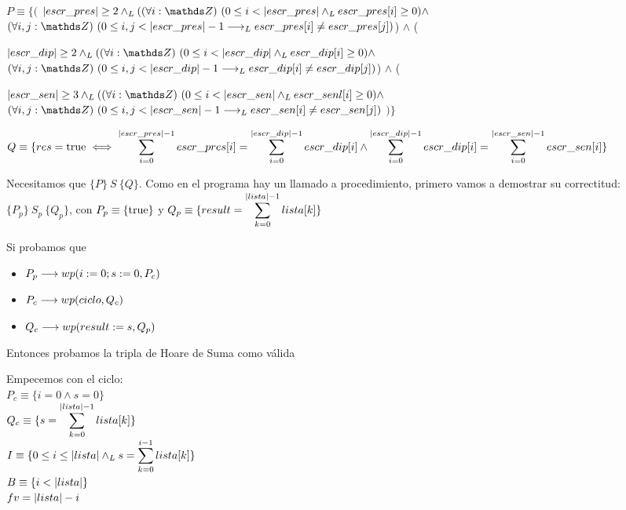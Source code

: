 \documentclass[10pt,a4paper]{article}
\begin{document}
\begin{enumerate}
$P \equiv \{($\newline
$ \longitud{escr\_pres} \geq 2 \yLuego (\paraTodo[unalinea]{i}{\ent}{0 \leq i < \longitud{escr\_pres} \yLuego escr\_pres[i] \geq 0} \land$ \newline
$\paraTodo[unalinea]{i, j}{\ent}{0 \leq i, j < \longitud{escr\_pres} - 1 \implicaLuego escr\_pres[i] \neq escr\_pres[j]}  $\newline ) $\land$ (

$\longitud{escr\_dip} \geq 2 \yLuego (\paraTodo[unalinea]{i}{\ent}{0 \leq i < \longitud{escr\_dip} \yLuego escr\_dip[i] \geq 0} \land$ \newline
$\paraTodo[unalinea]{i, j}{\ent}{0 \leq i, j < \longitud{escr\_dip} - 1 \implicaLuego escr\_dip[i] \neq escr\_dip[j]} $\newline ) $\land$ (

$\longitud{escr\_sen} \geq 3 \yLuego (\paraTodo[unalinea]{i}{\ent}{0 \leq i < \longitud{escr\_sen} \yLuego escr\_senl[i] \geq 0} \land$ \newline
$\paraTodo[unalinea]{i, j}{\ent}{0 \leq i, j < \longitud{escr\_sen} - 1 \implicaLuego escr\_sen[i] \neq escr\_sen[j]}$\newline 
$)\}$

$Q \equiv \{ res = \mathrm{true} \iff 
\displaystyle\sum_{i=0}^{|escr\_pres|-1} escr\_pres[i] = \displaystyle\sum_{i=0}^{|escr\_dip|-1} escr\_dip[i] \land 
\displaystyle\sum_{i=0}^{|escr\_dip|-1} escr\_dip[i] = \displaystyle\sum_{i=0}^{|escr\_sen|-1} escr\_sen[i] \}$
\newline \newline \newline

Necesitamos que $\{P\} \ S\ \{Q\}$. Como en el programa hay un llamado a procedimiento, primero vamos a demostrar su correctitud:
$\{P_p\} \ S_p\ \{Q_p\}$, con $P_p \equiv \{\mathrm{true}\}$ y $Q_p \equiv \{result = \displaystyle\sum_{k=0}^{|lista|-1} lista[k]\}$

Si probamos que
\begin{itemize}
    \item $P_p \longrightarrow wp(i := 0; s := 0, P_c)$
    \item $P_c \longrightarrow  wp(ciclo, Q_c)$
    \item $Q_c \longrightarrow wp(result := s, Q_p)$
\end{itemize}
Entonces probamos la tripla de Hoare de Suma como válida

Empecemos con el ciclo:\\
$P_c \equiv \{ i=0 \land s=0 \}$\\
$Q_c \equiv \{ s= \displaystyle\sum_{k=0}^{|lista|-1} lista[k]\}$\\
$I \equiv \{ 0 \leq i \leq |lista| \land _L s = \displaystyle\sum_{k=0}^{i-1} lista[k] \}$\\
$B \equiv \{ i < |lista| \}$\\
$fv = |lista| - i$\\


\end{enumerate}
\end{document}

